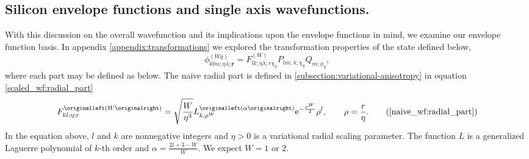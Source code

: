 

%
%

\subsection{Silicon envelope functions and single axis wavefunctions.}

With this discussion on the overall wavefunction and its implications upon the
envelope functions in mind, we examine our envelope function basis. In appendix
\ref{appendix:transformations} we explored the transformation properties of the
state defined below,
\begin{equation}
  \phi_{klm;\eta\lambda;\bm{r}}^{(Wq)}
  =
  F_{lk;\eta\lambda;r\chi_{q}}^{\left(W\right)}
  P_{lm;\lambda;\chi_{q}}
  Q_{m;\phi_{q}}
  ,
\end{equation}
where each part may be defined as below. The naive radial part is defined in
\ref{subsection:variational-anisotropy} in equation
\eqref{scaled_wf:radial_part}
\begin{equation}
  F_{kl;\eta;r}^{\left(W\right)}
  =
  \sqrt{\frac{W}{\eta^{3}}}
  L_{k;\rho^{W}}^{\left(\alpha\right)}
  \mathrm{e}^{-\frac{\rho^{W}}{2}}
  \rho^{l},
  \quad\quad
  \rho = \frac{r}{\eta}
  .
  \tag{\ref{naive_wf:radial_part}}
\end{equation}
In the equation above, $l$ and $k$ are nonnegative integers and $\eta > 0$ is a
variational radial scaling parameter. The function $L$ is a generalized Laguerre
polynomial of $k$-th order and $\alpha = \frac{2l + 3 - W}{W}$. We expect $W =
1$ or $2$.

